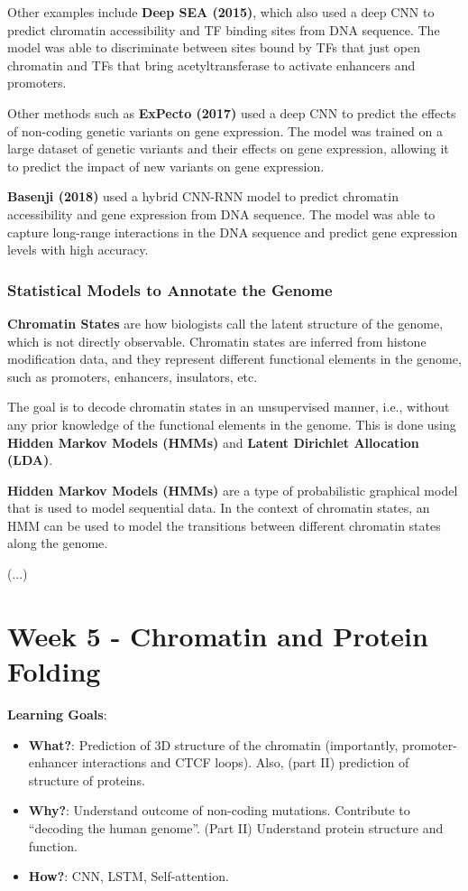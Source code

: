 \documentclass[a4paper]{article}
\begin{document}
Other examples include \textbf{Deep SEA (2015)}, which also used a deep CNN to
predict chromatin accessibility and TF binding sites from DNA sequence. The model
was able to discriminate between sites bound by TFs that just open chromatin and 
TFs that bring acetyltransferase to activate enhancers and promoters.

Other methods such as \textbf{ExPecto (2017)} used a deep CNN to predict the
effects of non-coding genetic variants on gene expression. The model was trained
on a large dataset of genetic variants and their effects on gene expression,
allowing it to predict the impact of new variants on gene expression.

\textbf{Basenji (2018)} used a hybrid CNN-RNN model to predict chromatin
accessibility and gene expression from DNA sequence. The model was able to
capture long-range interactions in the DNA sequence and predict gene expression
levels with high accuracy.

\subsubsection*{Statistical Models to Annotate the Genome}

\textbf{Chromatin States} are how biologists call the latent structure of the
genome, which is not directly observable. Chromatin states are inferred from
histone modification data, and they represent different functional elements
in the genome, such as promoters, enhancers, insulators, etc.

The goal is to decode chromatin states in an unsupervised manner, i.e., without
any prior knowledge of the functional elements in the genome. This is done using
\textbf{Hidden Markov Models (HMMs)} and \textbf{Latent Dirichlet Allocation (LDA)}.

\textbf{Hidden Markov Models (HMMs)} are a type of probabilistic graphical model
that is used to model sequential data. In the context of chromatin states, an HMM
can be used to model the transitions between different chromatin states along the
genome.

(...)

\newpage

\section*{Week 5 - Chromatin and Protein Folding}

\textbf{Learning Goals}:

\begin{itemize}
  \item \textbf{What?}: Prediction of 3D structure of the chromatin (importantly,
  promoter-enhancer interactions and CTCF loops). Also, (part II) prediction
  of structure of proteins.
  
  \item \textbf{Why?}: Understand outcome of non-coding mutations.
  Contribute to ``decoding the human genome''. (Part II) Understand protein
  structure and function.
  
  \item \textbf{How?}: CNN, LSTM, Self-attention.

\end{itemize}
\end{document}
